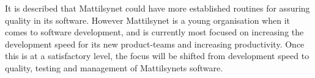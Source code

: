 It is described that Mattilsynet could have more established routines for assuring quality in its software. However Mattilsynet is a young organisation when it comes to software development, and is currently most focused on increasing the development speed for its new product-teams and increasing productivity. Once this is at a satisfactory level, the focus will be shifted from development speed to quality, testing and management of Mattilsynets software.









